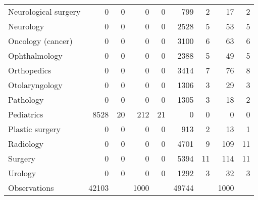 \begin{tabular}{lrrrrrrrr}
Neurological surgery&           0&           0&           0&           0&         799&           2&          17&           2\\
Neurology   &           0&           0&           0&           0&        2528&           5&          53&           5\\
Oncology (cancer)&           0&           0&           0&           0&        3100&           6&          63&           6\\
Ophthalmology&           0&           0&           0&           0&        2388&           5&          49&           5\\
Orthopedics &           0&           0&           0&           0&        3414&           7&          76&           8\\
Otolaryngology&           0&           0&           0&           0&        1306&           3&          29&           3\\
Pathology   &           0&           0&           0&           0&        1305&           3&          18&           2\\
Pediatrics  &        8528&          20&         212&          21&           0&           0&           0&           0\\
Plastic surgery&           0&           0&           0&           0&         913&           2&          13&           1\\
Radiology   &           0&           0&           0&           0&        4701&           9&         109&          11\\
Surgery     &           0&           0&           0&           0&        5394&          11&         114&          11\\
Urology     &           0&           0&           0&           0&        1292&           3&          32&           3\\
\midrule Observations & 42103 & & 1000 & & 49744 & & 1000 & \\ \bottomrule \end{tabular}
